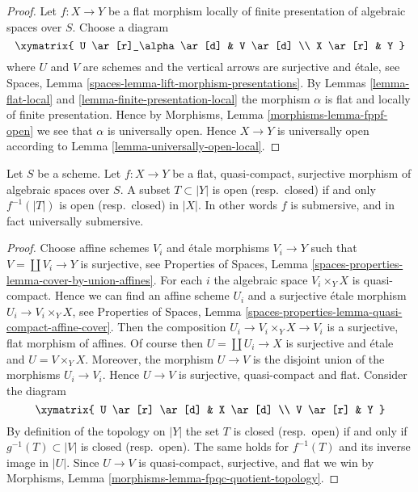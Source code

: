 \begin{proof}
Let $f : X \to Y$ be a flat morphism locally of finite presentation
of algebraic spaces over $S$. Choose a diagram
$$
\xymatrix{
U \ar[r]_\alpha \ar[d] & V \ar[d] \\
X \ar[r] & Y
}
$$
where $U$ and $V$ are schemes and the vertical arrows are surjective and
\'etale, see
Spaces, Lemma \ref{spaces-lemma-lift-morphism-presentations}.
By
Lemmas \ref{lemma-flat-local} and \ref{lemma-finite-presentation-local}
the morphism $\alpha$ is flat and locally of finite presentation.
Hence by
Morphisms, Lemma \ref{morphisms-lemma-fppf-open}
we see that $\alpha$ is universally open.
Hence $X \to Y$ is universally open according to
Lemma \ref{lemma-universally-open-local}.
\end{proof}

\begin{lemma}
\label{lemma-fpqc-quotient-topology}
Let $S$ be a scheme.
Let $f : X \to Y$ be a flat, quasi-compact, surjective morphism of
algebraic spaces over $S$.
A subset $T \subset |Y|$ is open (resp.\ closed) if and only
$f^{-1}(|T|)$ is open (resp.\ closed) in $|X|$.
In other words $f$ is submersive, and in fact universally submersive.
\end{lemma}

\begin{proof}
Choose affine schemes $V_i$ and \'etale morphisms $V_i \to Y$ such that
$V = \coprod V_i \to Y$ is surjective, see
Properties of Spaces,
Lemma \ref{spaces-properties-lemma-cover-by-union-affines}.
For each $i$ the algebraic space $V_i \times_Y X$ is quasi-compact.
Hence we can find an affine scheme $U_i$ and a surjective \'etale morphism
$U_i \to V_i \times_Y X$, see
Properties of Spaces,
Lemma \ref{spaces-properties-lemma-quasi-compact-affine-cover}.
Then the composition $U_i \to V_i \times_Y X \to V_i$ is a surjective,
flat morphism of affines.
Of course then $U = \coprod U_i \to X$ is surjective and \'etale
and $U = V \times_Y X$. Moreover, the morphism $U \to V$ is the
disjoint union of the morphisms $U_i \to V_i$. Hence $U \to V$ is surjective,
quasi-compact and flat. Consider the diagram
$$
\xymatrix{
U \ar[r] \ar[d] & X \ar[d] \\
V \ar[r] & Y
}
$$
By definition of the topology on $|Y|$ the set $T$ is closed
(resp.\ open) if and only if $g^{-1}(T) \subset |V|$ is closed
(resp.\ open). The same holds for
$f^{-1}(T)$ and its inverse image in $|U|$.
Since $U \to V$ is quasi-compact, surjective,  and flat we win by
Morphisms, Lemma \ref{morphisms-lemma-fpqc-quotient-topology}.
\end{proof}


